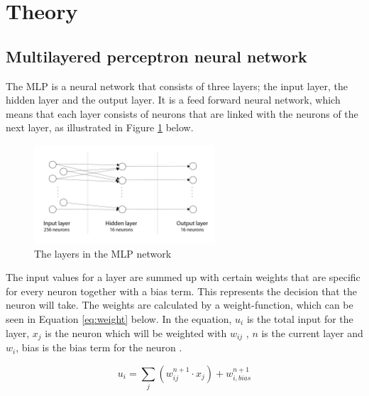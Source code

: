 \documentclass[12pt]{report}
\begin{document}
\section*{Theory}

\subsection*{Multilayered perceptron neural network}

The MLP is a neural network that consists of three layers; the input layer, the hidden layer and the output layer.  It is a feed forward neural network, which means that each layer consists of neurons that are linked with the neurons of the next layer, as illustrated in Figure \ref{fig:layers} below.

\begin{figure}[!ht]
	\centering
	\includegraphics[width=0.6\textwidth]{Images/mlp_layers.png}
	\caption{\label{fig:layers} The layers in the MLP network}
	\centering
\end{figure}
The input values for a layer are summed up with certain weights that are specific for every neuron together with a bias term. This represents the decision that the neuron will take. The weights are calculated by a weight-function, which can be seen in Equation \ref{eq:weight} below. In the equation, $u_i$ is the total input for the layer, $x_j$  is the neuron which will be weighted with $w_{ij}$ , $n$ is the current layer and  $w_i$, bias is the bias term for the neuron \cite{mlp}. 

\begin{equation}
  \label{eq:weight}
  u_{i}=\sum_{j}(w_{ij}^{n+1}\cdot x_{j}) + w_{i,bias}^{n+1}
\end{equation}
\end{document}
